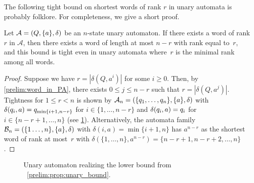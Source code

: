 
The following tight bound on shortest words of rank $r$ in unary automata
is probably folklore. For completeness, we give a short proof.

\begin{proposition}
	\label{prelim:prop:unary_bound}
	Let $\mathcal A = (Q, \{a\}, \delta)$
	be an $n$-state unary automaton.
	If there exists a word of rank $r$ in $\mathcal A$,
	then there exists a word of length at most $n - r$
	with rank equal to~$r$,	and this bound is tight
	even in unary automata where~$r$ is the minimal rank among all words. 
\end{proposition}
\begin{proof} 
	Suppose we have $r = |\delta(Q, a^i)|$
	for some $i \ge 0$.
	Then, by \cref{prelim:word_in_PA},
	there exists  $0 \le j \le  n - r$
	such that $r = |\delta(Q, a^j)|$.
	Tightness for $1 \le r < n$ is shown
	by $\mathcal A_n = (\{q_1,\ldots,q_n\}, \{a\}, \delta)$
	with $\delta(q_i,a) = q_{\min\{i+1,n-r\}}$
	for $i \in \{1,\ldots,n-r\}$ and $\delta(q_i,a) = q_i$
	for $i \in \{n-r+1,\ldots,n\}$ (see \cref{prelim:fig:unary_tight}).    
    Alternatively, the automata family $\mathcal B_{n} = (\{1\ldots,n\}, \{a\}, \delta)$
	with $\delta(i, a) = \min\{i+1,n\}$
	has $a^{n-r}$ as the shortest word of rank at most~$r$
	with $\delta(\{1,\ldots,n\}, a^{n-r}) = \{n - r + 1, n - r + 2, \ldots, n\}$.
\end{proof}

\begin{figure}[h]
	\centering 
	\caption[Unary automaton for lower bound of rank $r$ words]{Unary automaton realizing the lower bound from \PROP~\ref{prelim:prop:unary_bound}.}
	\label{prelim:fig:unary_tight}
\end{figure}

